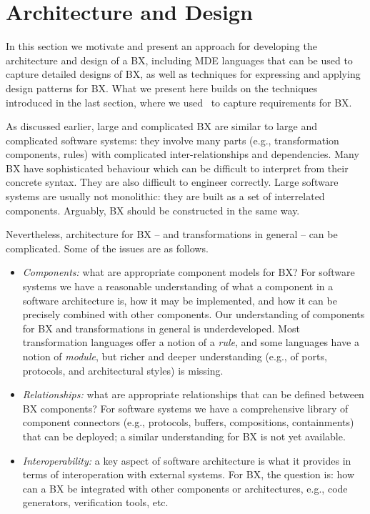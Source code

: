 \section{Architecture and Design}
\label{section:architecture-and-design}

In this section we motivate and present an approach for developing the architecture and design of a BX, including MDE languages that can be used to capture detailed designs of BX, as well as techniques for expressing and applying design patterns for BX. What we present here builds on the techniques introduced in the last section, where we used \transml\ to capture requirements for BX.

As discussed earlier, large and complicated BX are similar to large and complicated software systems: they involve many parts (e.g., transformation components, rules) with complicated inter-relationships and dependencies. Many BX have sophisticated behaviour which can be difficult to interpret from their concrete syntax. They are also difficult to engineer correctly. Large software systems are usually not monolithic: they are built as a set of interrelated components. Arguably, BX should be constructed in the same way. 

Nevertheless, architecture for BX -- and transformations in general -- can be complicated. Some of the issues are as follows.
\begin{itemize}
\item \textit{Components:} what are appropriate component models for BX? For software systems we have a reasonable understanding of what a component in a software architecture is, how it may be implemented, and how it can be precisely combined with other components. Our understanding of components for BX and transformations in general is underdeveloped. Most transformation languages offer a notion of a \textit{rule}, and some languages have a notion of \textit{module}, but richer and deeper understanding (e.g., of ports, protocols, and architectural styles) is missing.

\item \textit{Relationships:} what are appropriate relationships that can be defined between BX components? For software systems we have a comprehensive library of component connectors (e.g., protocols, buffers, compositions, containments) that can be deployed; a similar understanding for BX is not yet available.

\item \textit{Interoperability:} a key aspect of software architecture is what it provides in terms of interoperation with external systems. For BX, the question is: how can a BX be integrated with other components or architectures, e.g., code generators, verification tools, etc. 
\end{itemize}

